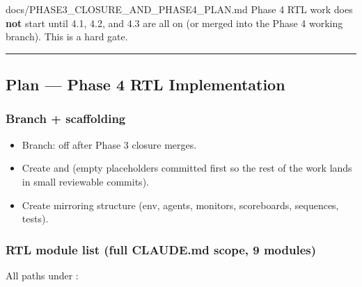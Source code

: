 \begin{relocated}{docs/PHASE3_CLOSURE_AND_PHASE4_PLAN.md}
Phase 4 RTL work does \textbf{not} start until 4.1, 4.2, and 4.3 are all
on  (or merged into the Phase 4 working branch). This is a
hard gate.

\begin{center}\rule{0.5\linewidth}{0.5pt}\end{center}

\subsection{Plan --- Phase 4 RTL Implementation}\label{ds:ch:phase3-closure-phase4-plan:5-plan-phase-4-rtl-implementation}

\subsubsection{Branch + scaffolding}\label{ds:ch:phase3-closure-phase4-plan:51-branch-scaffolding}

\begin{itemize}
\tightlist
\item
  Branch:  off  after Phase 3
  closure merges.
\item
  Create  and  (empty placeholders
  committed first so the rest of the work lands in small reviewable
  commits).
\item
  Create  mirroring  structure (env,
  agents, monitors, scoreboards, sequences, tests).
\end{itemize}

\subsubsection{RTL module list (full CLAUDE.md scope, 9 modules)}\label{ds:ch:phase3-closure-phase4-plan:52-rtl-module-list-full-claudemd-scope-9-modules}

All paths under :

{\small\setlength{\tabcolsep}{4pt}

}
\end{relocated}
